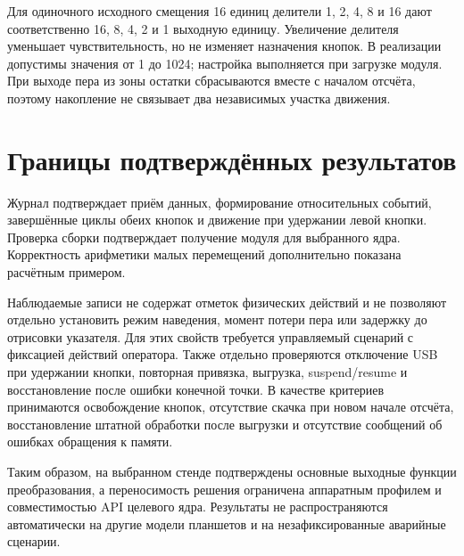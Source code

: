 Для одиночного исходного смещения 16 единиц делители 1, 2, 4, 8 и 16 дают соответственно 16, 8, 4, 2 и 1 выходную единицу. Увеличение делителя уменьшает чувствительность, но не изменяет назначения кнопок. В реализации допустимы значения от 1 до 1024; настройка выполняется при загрузке модуля. При выходе пера из зоны остатки сбрасываются вместе с началом отсчёта, поэтому накопление не связывает два независимых участка движения.

\section{Границы подтверждённых результатов}

Журнал подтверждает приём данных, формирование относительных событий, завершённые циклы обеих кнопок и движение при удержании левой кнопки. Проверка сборки подтверждает получение модуля для выбранного ядра. Корректность арифметики малых перемещений дополнительно показана расчётным примером.

Наблюдаемые записи не содержат отметок физических действий и не позволяют отдельно установить режим наведения, момент потери пера или задержку до отрисовки указателя. Для этих свойств требуется управляемый сценарий с фиксацией действий оператора. Также отдельно проверяются отключение USB при удержании кнопки, повторная привязка, выгрузка, suspend/resume и восстановление после ошибки конечной точки. В качестве критериев принимаются освобождение кнопок, отсутствие скачка при новом начале отсчёта, восстановление штатной обработки после выгрузки и отсутствие сообщений об ошибках обращения к памяти.

Таким образом, на выбранном стенде подтверждены основные выходные функции преобразования, а переносимость решения ограничена аппаратным профилем и совместимостью API целевого ядра. Результаты не распространяются автоматически на другие модели планшетов и на незафиксированные аварийные сценарии.
\clearpage
